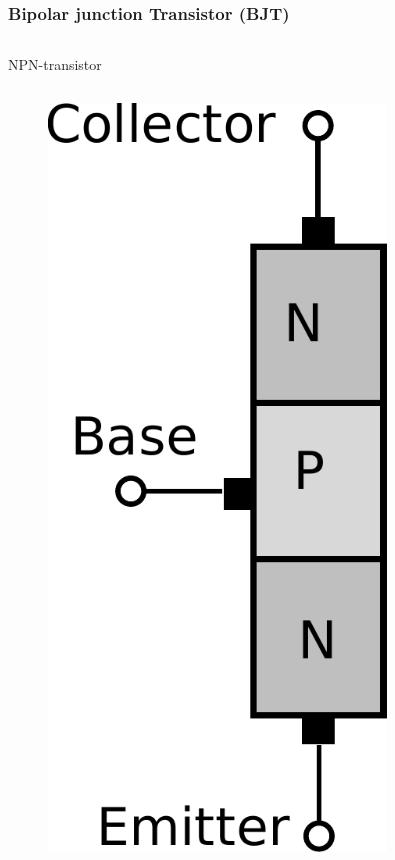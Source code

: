 \documentclass[beamer]{standalone}
\begin{document}
\begin{frame}
\frametitle{Bipolar junction Transistor (BJT)}
\begin{columns}[t]
 \begin{column}{.5\textwidth}
  NPN-transistor
  \begin{columns}[t]
   \begin{column}{.40\textwidth}
    \begin{figure}
     \includegraphics[width=0.80\textwidth]{./pics/npn_transistor.pdf}
    \end{figure}

\end{column}
\end{columns}
\end{column}
\end{columns}
\end{frame}
\end{document}
